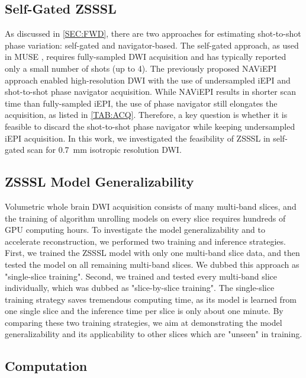 \documentclass[journal,twoside,web]{ieeecolor}
\begin{document}
	\subsection{Self-Gated ZSSSL}

	As discussed in \cref{SEC:FWD}, there are two approaches for
	estimating shot-to-shot phase variation: self-gated and navigator-based.
	The self-gated approach, as used in MUSE \cite{chen_2013_muse},
	requires fully-sampled DWI acquisition and
	has typically reported only a small number of shots (up to 4).
	The previously proposed NAViEPI approach enabled high-resolution DWI
	with the use of undersampled iEPI and shot-to-shot phase navigator acquisition.
	While NAViEPI results in shorter scan time than fully-sampled iEPI,
	the use of phase navigator still elongates the acquisition,
	as listed in \cref{TAB:ACQ}.
	Therefore, a key question is whether it is feasible to
	discard the shot-to-shot phase navigator 
	while keeping undersampled iEPI acquisition.
	In this work, we investigated the feasibility of ZSSSL in self-gated scan
	for \SI{0.7}{\milli\meter} isotropic resolution DWI.

	\subsection{ZSSSL Model Generalizability} \label{SEC:ZSSSL_GEN}

	Volumetric whole brain DWI acquisition consists of many multi-band slices, 
	and the training of algorithm unrolling models on every slice requires 
	hundreds of GPU computing hours. 
	To investigate the model generalizability and to accelerate reconstruction, 
	we performed two training and inference strategies. 
	First, we trained the ZSSSL model with only one multi-band slice data, 
	and then tested the model on all remaining multi-band slices. 
	We dubbed this approach as "single-slice training". 
	Second, we trained and tested every multi-band slice individually, 
	which was dubbed as "slice-by-slice training". 
	The single-slice training strategy saves tremendous computing time, 
	as its model is learned from one single slice and 
	the inference time per slice is only about one minute. 
	By comparing these two training strategies, 
	we aim at demonstrating the model generalizability and 
	its applicability to other slices which are "unseen" in training.

	\subsection{Computation}
\end{document}
